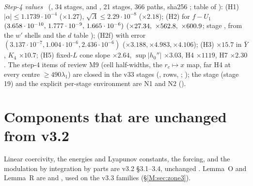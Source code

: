 \documentclass[11pt]{article}
\begin{document}
\noindent\emph{Step-4 values} \tC\ (, 34 stages, and , 21 stages, 366 paths, sha256 ; table of ): (H1) $|\alpha|\le1.1739\cdot10^{-4}$ ($\times1.27$), $\sqrt\Lambda\le2.29\cdot10^{-8}$ ($\times2.18$); (H2) for $f-U_1$ $(3.658\cdot10^{-10},\,1.777\cdot10^{-9},\,1.665\cdot10^{-6})$ ($\times27.34,\ \times562.8,\ \times600.9$; stage , from the $w'$ shells and the $d$ table ); (H2f) with error $(3.137\cdot10^{-7},1.004\cdot10^{-6},2.436\cdot10^{-6})$ ($\times3.188,\times4.983,\times4.106$); (H3) $\times15.7$ in $\bar Y$, $K_4$ $\times10.7$; (H5) fixed-$L$ cone slope $\times2.64$, $\sup|h_0''|$ $\times3.03$, H4 $\times1119$, H7 $\times2.30$. The step-4 items of review M9 (cell half-widths, the $r_c\mapsto x$ map, far H4 at every centre $\ge490\lambda_1$) are closed in the v33 stages (,  rows, ; ); the stage  (stage 19) and the explicit per-stage environment are N1 and N2 ().

\section{Components that are unchanged from v3.2}\label{M:sec:unchanged}
Linear coercivity, the energies and Lyapunov constants, the forcing, and the modulation by integration by parts are v3.2 \S3.1--3.4, unchanged \tC. Lemma~O and Lemma~R are  and , used on the v3.3 families (\S\ref{M:sec:zone3}).
\end{document}
